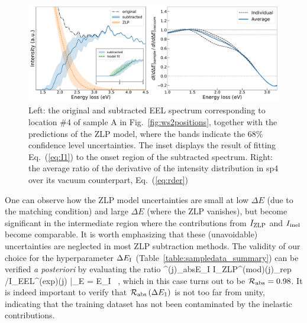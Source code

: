 \begin{figure}[t]
\begin{centering}
  \includegraphics[width=0.99\linewidth]{plots/SubtractedEELS_plot_sp14.pdf}
   \caption{Left: the original
     and subtracted EEL spectrum corresponding to location \#4 of sample A in Fig.~\ref{fig:ws2positions},
     together with the predictions of the ZLP model, where
     the bands indicate the 68\% confidence level uncertainties.
     The inset displays the result of fitting Eq.~(\ref{eq:I1}) to the onset
     region of the subtracted spectrum.
     Right: the average ratio of the derivative of the intensity
     distribution in sp4 over its vacuum counterpart, Eq.~(\ref{eq:rder})
  }
\label{fig:sp14_subtracted_spectrum}
\end{centering}
\end{figure}

One can observe how the ZLP model uncertainties are small at low $\Delta E$
(due to the matching condition) and large $\Delta E$ (where the ZLP vanishes),
but become significant in the intermediate region where the contributions
from $I_{\rm ZLP}$ and $I_{\rm inel}$ become comparable.
%
It is worth emphasizing that these (unavoidable) uncertainties are neglected in most
ZLP subtraction methods.
%
The validity of our choice for the hyperparameter $\Delta E_{\rm I}$ (Table~\ref{table:sampledata_summary})
can be verified {\it a posteriori} by evaluating the ratio
\be
{}^{(j)}_{\rm abs}\lp \Delta E_{\rm I}\rp \equiv 
\la I_{\rm ZLP}^{({\rm mod})(j)}\ra_{\rm rep} \Big/I_{\rm EEL}^{({\rm exp})(j)} \Big|_{\Delta E = \Delta E_{\rm I}} \, ,
\ee
which in this case turns out to be $\mathcal{R}_{\rm abs} = 0.98$.
%
It is indeed important to verify that $\mathcal{R}_{\rm abs}\left( \Delta E_1\right)$ is not too far from unity,
indicating that the training dataset has not been contaminated by the inelastic contributions.


